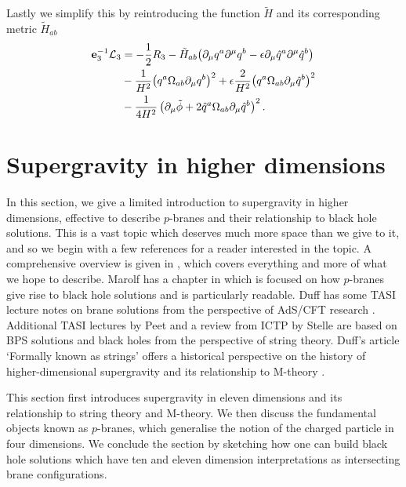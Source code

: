 Lastly we simplify this by reintroducing the function $\tilde{H}$ and its corresponding metric $\tilde{H}_{ab}$ \cite{Mohaupt:2011aa}
\begin{equation}
\begin{aligned}
\label{eq:3dlag}
 \mathbf{e}_3^{-1} {\cal L}_3 &= - \frac{1}{2}R_3 - \tilde{H}_{ab}\big(\partial_\mu q^a\partial^\mu q^b - \epsilon \partial_\mu \hat{q}^a \partial^\mu \hat{q}^b \big) \\
 &- \frac{1}{H^2} \big(q^a\Omega_{ab}\partial_\mu q^b \big)^2 + \epsilon \frac{2}{H^2}\big(q^a\Omega_{ab}\partial_\mu \hat{q}^b \big)^2 \\
 &- \frac{1}{4H^2} \left(\partial_\mu \tilde{\phi} + 2\hat{q}^a \Omega_{ab} \partial_\mu \hat{q}^b \right)^2.
\end{aligned}
\end{equation}




\section{Supergravity in higher dimensions}
\label{sec:pbranes}

In this section, we give a limited introduction to supergravity in higher dimensions, effective to describe $p$-branes and their relationship to black hole solutions. This is a vast topic which deserves much more space than we give to it, and so we begin with a few references for a reader interested in the topic. A comprehensive overview is given in \cite{Youm:1997hw}, which covers everything and more of what we hope to describe. Marolf has a chapter in \cite{Horowitz:2012nnc} which is focused on how $p$-branes give rise to black hole solutions and is particularly readable. Duff has some TASI lecture notes on brane solutions from the perspective of AdS/CFT research \cite{Duff:1999rk}. Additional TASI lectures by Peet \cite{Peet:2000hn} and a review from ICTP by Stelle \cite{Stelle:1998xg} are based on BPS solutions and black holes from the perspective of string theory. Duff's article `Formally known as strings' offers a historical perspective on the history of higher-dimensional supergravity and its relationship to M-theory \cite{Duff:1996aw}.

This section first introduces supergravity in eleven dimensions and its relationship to string theory and M-theory. We then discuss the fundamental objects known as $p$-branes, which generalise the notion of the charged particle in four dimensions. We conclude the section by sketching how one can build black hole solutions which have ten and eleven dimension interpretations as intersecting brane configurations.


